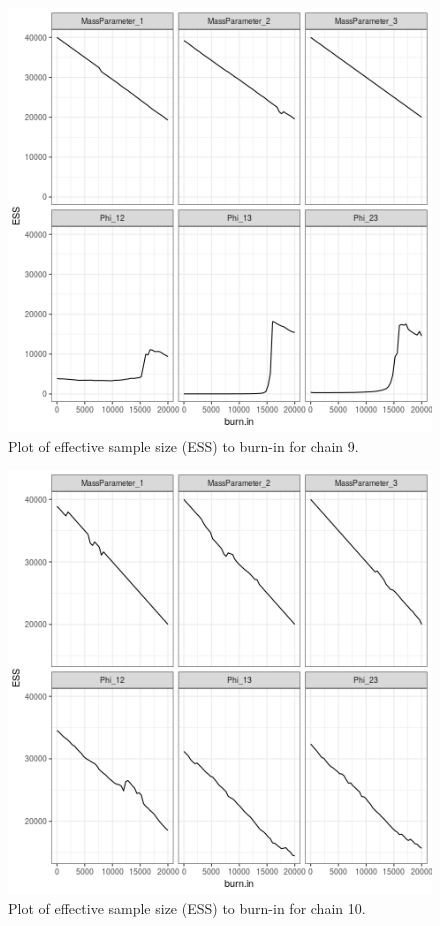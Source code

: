 \documentclass[12pt]{article} %
\begin{document}
\newpage

\begin{figure}[h]
	\centering
	\includegraphics[scale=0.65]{Images/Gen_data/Case_2/Esimated_burn_in_plot_9.png}
	\caption{Plot of effective sample size (ESS) to burn-in for chain 9.}
	\label{fig:case_2_esimated_burn_in_plot_9}
\end{figure}

\newpage

\begin{figure}[h]
	\centering
	\includegraphics[scale=0.65]{Images/Gen_data/Case_2/Esimated_burn_in_plot_10.png}
	\caption{Plot of effective sample size (ESS) to burn-in for chain 10.}
	\label{fig:case_2_esimated_burn_in_plot_10}
\end{figure}

\newpage
\end{document}
